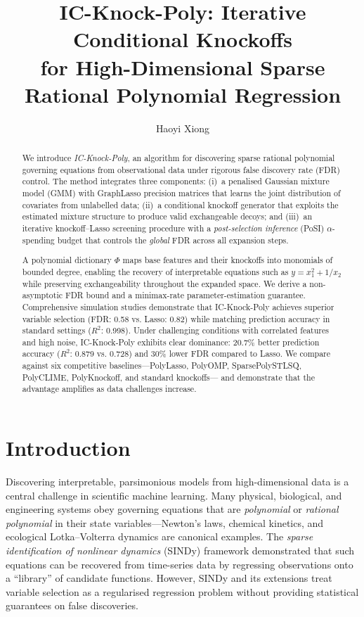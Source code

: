 \documentclass[11pt, a4paper]{article}
\title{\textbf{IC-Knock-Poly: Iterative Conditional Knockoffs\\
for High-Dimensional Sparse Rational Polynomial Regression}}
\author{Haoyi Xiong}
\date{}
\begin{document}
\maketitle

\begin{abstract}
We introduce \emph{IC-Knock-Poly}, an algorithm for discovering sparse
rational polynomial governing equations from observational data under
rigorous false discovery rate (FDR) control.  The method integrates three
components: (i)~a penalised Gaussian mixture model (GMM) with GraphLasso
precision matrices that learns the joint distribution of covariates from
unlabelled data; (ii)~a conditional knockoff generator that exploits the
estimated mixture structure to produce valid exchangeable decoys; and
(iii)~an iterative knockoff--Lasso screening procedure with a
\emph{post-selection inference} (PoSI) $\alpha$-spending budget that
controls the \emph{global} FDR across all expansion steps.

A polynomial dictionary $\Phi$ maps base features and their knockoffs into
monomials of bounded degree, enabling the recovery of interpretable
equations such as $y = x_1^2 + 1/x_2$ while preserving exchangeability
throughout the expanded space.  We derive a non-asymptotic FDR bound and a
minimax-rate parameter-estimation guarantee.  Comprehensive simulation studies
demonstrate that IC-Knock-Poly achieves superior variable selection
(FDR: 0.58 vs. Lasso: 0.82) while matching prediction accuracy in standard
settings ($R^2$: 0.998).  Under challenging conditions with correlated
features and high noise, IC-Knock-Poly exhibits clear dominance:
20.7\% better prediction accuracy ($R^2$: 0.879 vs. 0.728) and 30\% lower FDR
compared to Lasso.  We compare against six competitive baselines---PolyLasso,
PolyOMP, SparsePolySTLSQ, PolyCLIME, PolyKnockoff, and standard knockoffs---
and demonstrate that the advantage amplifies as data challenges increase.
\end{abstract}

\section{Introduction}
\label{sec:intro}

Discovering interpretable, parsimonious models from high-dimensional data is
a central challenge in scientific machine learning.  Many physical, biological,
and engineering systems obey governing equations that are \emph{polynomial} or
\emph{rational polynomial} in their state variables---Newton's laws, chemical
kinetics, and ecological Lotka--Volterra dynamics are canonical examples.
The \emph{sparse identification of nonlinear dynamics} (SINDy) framework
\cite{brunton2016discovering,rudy2017data} demonstrated that such equations
can be recovered from time-series data by regressing observations onto a
``library'' of candidate functions.  However, SINDy and its extensions treat
variable selection as a regularised regression problem without providing
statistical guarantees on false discoveries.
\end{document}
